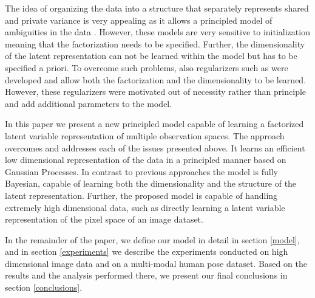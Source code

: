 The idea of organizing the data into a structure that separately
represents shared and private variance is very appealing as it allows
a principled model of ambiguities in the data
\cite{Ek:2008up}. However, these models are very sensitive to
initialization meaning that the factorization needs to be
specified. Further, the dimensionality of the latent representation
can not be learned within the model but has to be specified a
priori. To overcome such problems, also regularizers such as
\cite{Salzmann:2010vh} were developed and allow both the
factorization and the dimensionality to be learned. However, these
regularizers were motivated out of necessity rather than principle and
add additional parameters to the model.

In this paper we present a new principled model capable of learning a
factorized latent variable representation of multiple observation
spaces. The approach overcomes and addresses each of the issues
presented above. It learns an efficient low dimensional representation
of the data in a principled manner based on Gaussian
Processes. In contrast to previous approaches the model is fully
Bayesian, capable of learning both the dimensionality and the
structure of the latent representation. Further, the proposed model is
capable of handling extremely high dimensional data, such as directly
learning a latent variable representation of the pixel space of an image dataset.

In the remainder of the paper, we define our model in detail in section \ref{model},
and in section \ref{experiments} we describe the experiments conducted on high dimensional image data and on
a multi-modal human pose dataset. Based on the results and the analysis performed there, we
present our final conclusions in section \ref{conclusions}.